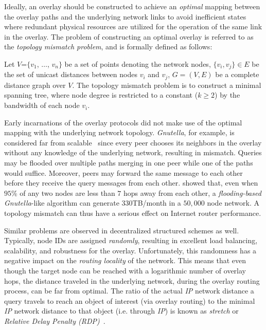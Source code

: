 Ideally, an overlay should be constructed to achieve an \emph{optimal} 
mapping between the overlay paths and the underlying network links to avoid
inefficient states where redundant physical resources are utilized for the
operation of the same link in the overlay. 
The problem of constructing an optimal
overlay is referred to as the \emph{topology mismatch problem}, and is formally
defined as follows:
\begin{definition}
Let $V$=$\{v_1$, $\dots$, $v_n\}$ be a set of points denoting the network nodes,
$\{v_i, v_j\} \in E$ be the set of unicast distances between nodes $v_i$ and
$v_j$, $G=(V,E)$ be a complete distance graph over $V$. The topology mismatch
problem is to construct a minimal spanning tree, where node degree is
restricted to a constant ($k\geq 2$) by the bandwidth of each node $v_i$.
\end{definition}

Early incarnations of the overlay protocols did not make use of the optimal
mapping with the underlying network topology. {\sl Gnutella}, for example, is
considered far from scalable~\cite{ritter_gnucantscale_2001} since every peer
chooses its neighbors in the overlay without any knowledge of the underlying
network, resulting in mismatch. 
Queries may be flooded over multiple paths merging in one peer 
while one of the paths would suffice.  
Moreover, peers may forward the same message to each other
before they receive the query messages from each other.
\cite{matei_mapgnutella_2002} showed that, even when $95$\% of any two nodes 
are less than $7$ hops away from each other, 
a \emph{flooding-based} {\sl Gnutella}-like algorithm 
can generate $330$TB/month in a $50,000$ node network. 
A topology mismatch can thus have a serious effect 
on Internet router performance.

Similar problems are observed in decentralized structured schemes as well.
Typically, node IDs are assigned \emph{randomly}, resulting in excellent load
balancing, scalability, and robustness for the overlay. Unfortunately, this
randomness has a negative impact on the \emph{routing locality} of the network.
This means that even though the target node can be reached with a logarithmic
number of overlay hops, the distance traveled in the underlying network, 
during the overlay routing process, can be far from optimal.  
The ratio of the actual \emph{IP} network distance a query travels to 
reach an object of interest (via overlay routing) to 
the minimal \emph{IP} network distance to that object 
(i.e. through \emph{IP}) is known as \emph{stretch} 
or \emph{Relative Delay Penalty (RDP)}~\cite{CRZ2000}.


